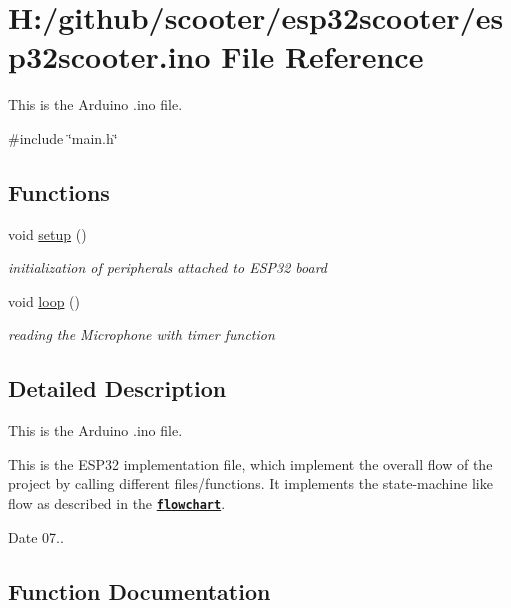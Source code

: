 \hypertarget{esp32scooter_8ino}{}\section{H\+:/github/scooter/esp32scooter/esp32scooter.ino File Reference}
\label{esp32scooter_8ino}


This is the Arduino .ino file.  


{\ttfamily \#include \char`\"{}main.\+h\char`\"{}}\newline
\subsection*{Functions}
\begin{DoxyCompactItemize}
\item 
void \mbox{\hyperlink{esp32scooter_8ino_a4fc01d736fe50cf5b977f755b675f11d}{setup}} ()
\begin{DoxyCompactList}\small\item\em initialization of peripherals attached to E\+S\+P32 board \end{DoxyCompactList}\item 
void \mbox{\hyperlink{esp32scooter_8ino_afe461d27b9c48d5921c00d521181f12f}{loop}} ()
\begin{DoxyCompactList}\small\item\em reading the Microphone with timer function \end{DoxyCompactList}\end{DoxyCompactItemize}


\subsection{Detailed Description}
This is the Arduino .ino file. 

This is the E\+S\+P32 implementation file, which implement the overall flow of the project by calling different files/functions. It implements the state-\/machine like flow as described in the \href{StatemachineFlow.pdf}{\texttt{ {\bfseries{flowchart}}}}.

\begin{DoxyDate}{Date}
07.. 
\end{DoxyDate}


\subsection{Function Documentation}
\mbox{\label{esp32scooter_8ino_afe461d27b9c48d5921c00d521181f12f}} 
